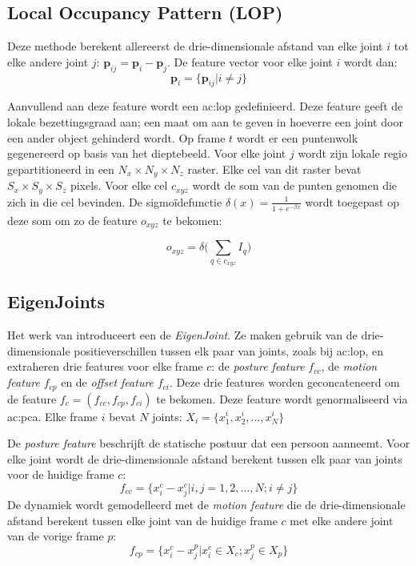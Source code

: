 \subsection{Local Occupancy Pattern (LOP)}
Deze methode \cite{Wang2012b} berekent allereerst de drie-dimensionale afstand van elke joint $i$ tot elke andere joint $j$: $\textbf{p}_{ij} = \textbf{p}_i - \textbf{p}_j$. De feature vector voor elke joint $i$ wordt dan:
$$\textbf{p}_i = \{\textbf{p}_{ij} | i \neq j \}$$

Aanvullend aan deze feature wordt een \gls{ac:lop} gedefinieerd. Deze feature geeft de lokale bezettingsgraad aan; een maat om aan te geven in hoeverre een joint door een ander object gehinderd wordt. Op frame $t$ wordt er een puntenwolk gegenereerd op basis van het dieptebeeld. Voor elke joint $j$ wordt zijn lokale regio gepartitioneerd in een $N_x \times N_y \times N_z$ raster. Elke cel van dit raster bevat $S_x \times S_y \times S_z$ pixels. Voor elke cel $c_{xyz}$ wordt de som van de punten genomen die zich in die cel bevinden. De sigmoïdefunctie $\delta(x) = \frac{1}{1 + e^{-\beta x}}$ wordt toegepast op deze som om zo de feature $o_{xyz}$ te bekomen:

$$o_{xyz} = \delta\bigg(\sum_{q \in c_{xyz}} I_q \bigg)$$
\subsection{EigenJoints}
Het werk van \cite{Yang2012} introduceert een de \textit{EigenJoint}. Ze maken gebruik van de drie-dimensionale positieverschillen tussen elk paar van joints, zoals bij \gls{ac:lop}, en extraheren drie features voor elke frame $c$: de \textit{posture feature} $f_{cc}$, de \textit{motion feature} $f_{cp}$ en de \textit{offset feature} $f_{ci}$. Deze drie features worden geconcateneerd om de feature $f_c = (f_{cc}, f_{cp}, f_{ci})$ te bekomen. Deze feature wordt genormaliseerd via \gls{ac:pca}. Elke frame $i$ bevat $N$ joints: $X_i = \{x_1^i, x_2^i, ..., x_N^i \}$

De \textit{posture feature} beschrijft de statische postuur dat een persoon aanneemt. Voor elke joint wordt de drie-dimensionale afstand berekent tussen elk paar van joints voor de huidige frame $c$:
$$f_{cc} = \{x_i^c - x_j^c | i , j = 1, 2, ..., N; i \neq j\}$$
De dynamiek wordt gemodelleerd met de \textit{motion feature} die de drie-dimensionale afstand berekent tussen elke joint van de huidige frame $c$ met elke andere joint van de vorige frame $p$: 
$$f_{cp} = \{x_i^c - x_j^p | x_i^c \in X_c ; x_j^p \in X_p \}$$

